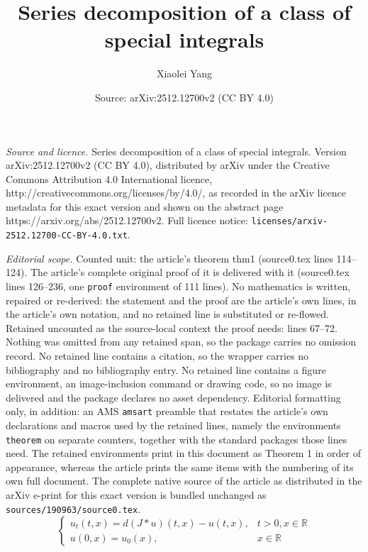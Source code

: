 \documentclass[10pt,a4paper]{amsart}
\title{Series decomposition of a class of special integrals}
\author{Xiaolei Yang}
\date{Source: arXiv:2512.12700v2 (CC BY 4.0)}
\begin{document}
\maketitle

\noindent\emph{Source and licence.} Series decomposition of a class of special integrals. Version arXiv:2512.12700v2 (CC BY 4.0), distributed by arXiv under the Creative Commons Attribution 4.0 International licence, http://creativecommons.org/licenses/by/4.0/, as recorded in the arXiv licence metadata for this exact version and shown on the abstract page https://arxiv.org/abs/2512.12700v2. Full licence notice: \texttt{licenses/arxiv-2512.12700-CC-BY-4.0.txt}.\par\smallskip

\noindent\textit{Editorial scope.} Counted unit: the article's theorem thm1 (source0.tex lines 114--124). The article's complete original proof of it is delivered with it (source0.tex lines 126--236, one \texttt{proof} environment of 111 lines). No mathematics is written, repaired or re-derived: the statement and the proof are the article's own lines, in the article's own notation, and no retained line is substituted or re-flowed.  Retained uncounted as the source-local context the proof needs: lines 67--72.  Nothing was omitted from any retained span, so the package carries no omission record.  No retained line contains a citation, so the wrapper carries no bibliography and no bibliography entry.  No retained line contains a figure environment, an image-inclusion command or drawing code, so no image is delivered and the package declares no asset dependency.  Editorial formatting only, in addition: an AMS \texttt{amsart} preamble that restates the article's own declarations and macros used by the retained lines, namely the environments \texttt{theorem} on separate counters, together with the standard packages those lines need.  The retained environments print in this document as Theorem 1 in order of appearance, whereas the article prints the same items with the numbering of its own full document.  The complete native source of the article as distributed in the arXiv e-print for this exact version is bundled unchanged as \texttt{sources/190963/source0.tex}.
\begin{equation}\label{1}
	\begin{cases}
		u_t(t,x) = d(J*u)(t,x) - u(t,x), & t > 0, x \in \mathbb{R} \\
		u(0,x) = u_0(x), & x \in \mathbb{R}
	\end{cases}
\end{equation}
\end{document}

